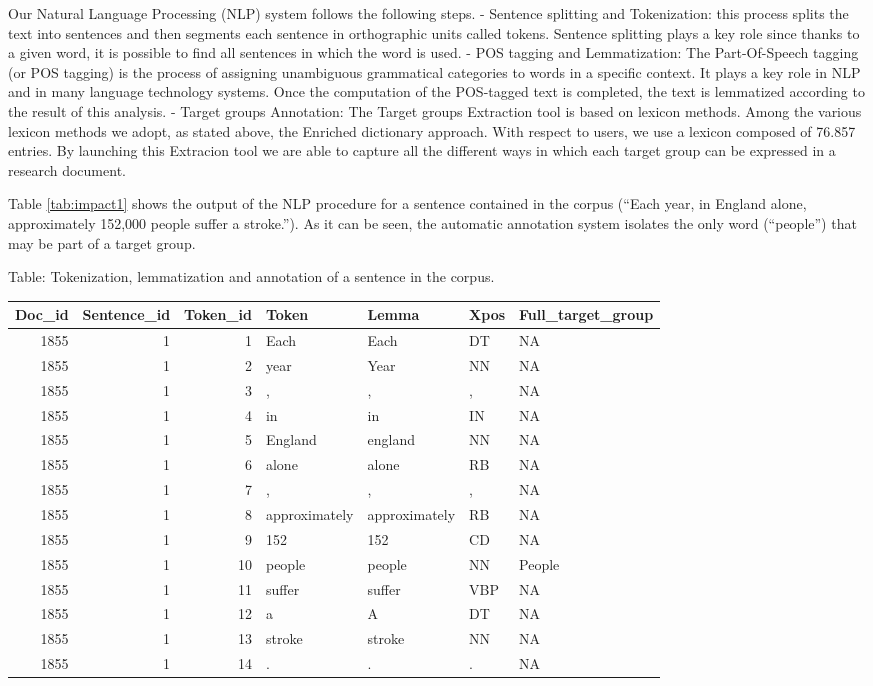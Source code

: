 \documentclass[]{book}
\begin{document}
Our Natural Language Processing (NLP) system follows the following
steps. - Sentence splitting and Tokenization: this process splits the
text into sentences and then segments each sentence in orthographic
units called tokens. Sentence splitting plays a key role since thanks to
a given word, it is possible to find all sentences in which the word is
used. - POS tagging and Lemmatization: The Part-Of-Speech tagging (or
POS tagging) is the process of assigning unambiguous grammatical
categories to words in a specific context. It plays a key role in NLP
and in many language technology systems. Once the computation of the
POS-tagged text is completed, the text is lemmatized according to the
result of this analysis. - Target groups Annotation: The Target groups
Extraction tool is based on lexicon methods. Among the various lexicon
methods we adopt, as stated above, the Enriched dictionary approach.
With respect to users, we use a lexicon composed of 76.857 entries. By
launching this Extracion tool we are able to capture all the different
ways in which each target group can be expressed in a research document.

Table \ref{tab:impact1} shows the output of the NLP procedure for a
sentence contained in the corpus (``Each year, in England alone,
approximately 152,000 people suffer a stroke.''). As it can be seen, the
automatic annotation system isolates the only word (``people'') that may
be part of a target group.

Table: \label{tab:impact1} Tokenization, lemmatization and annotation of a
sentence in the corpus.

\begin{tabular}{r|r|r|l|l|l|l}
\hline
Doc\_id & Sentence\_id & Token\_id & Token & Lemma & Xpos & Full\_target\_group\\
\hline
1855 & 1 & 1 & Each & Each & DT & NA\\
\hline
1855 & 1 & 2 & year & Year & NN & NA\\
\hline
1855 & 1 & 3 & , & , & , & NA\\
\hline
1855 & 1 & 4 & in & in & IN & NA\\
\hline
1855 & 1 & 5 & England & england & NN & NA\\
\hline
1855 & 1 & 6 & alone & alone & RB & NA\\
\hline
1855 & 1 & 7 & , & , & , & NA\\
\hline
1855 & 1 & 8 & approximately & approximately & RB & NA\\
\hline
1855 & 1 & 9 & 152 & 152 & CD & NA\\
\hline
1855 & 1 & 10 & people & people & NN & People\\
\hline
1855 & 1 & 11 & suffer & suffer & VBP & NA\\
\hline
1855 & 1 & 12 & a & A & DT & NA\\
\hline
1855 & 1 & 13 & stroke & stroke & NN & NA\\
\hline
1855 & 1 & 14 & . & . & . & NA\\
\hline
\end{tabular}
\end{document}
